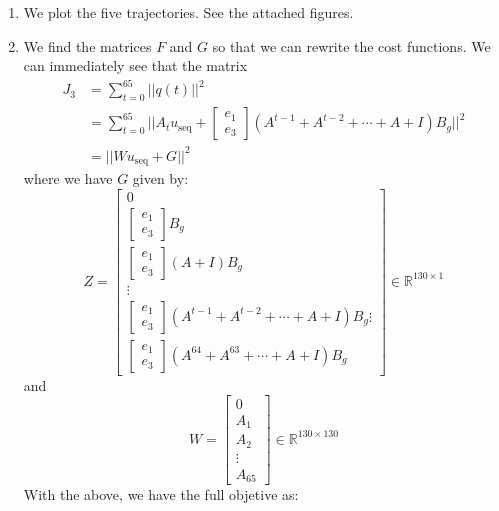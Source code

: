 \documentclass[12pt]{exam}
\begin{document}
\begin{questions}
\begin{solution}
\begin{enumerate}[label=(\alph*)]
      \item We plot the five trajectories. See the attached figures.
      \item We find the matrices $F$ and $G$ so that we can rewrite the cost functions. We can immediately see that the matrix 
      \begin{align*}
        J_3 &= \sum_{t=0}^{65} ||q(t)||^2 \\
        &= \sum_{t=0}^{65} || A_tu_{\text{seq}} + \begin{bmatrix} e_1 \\ e_3 \end{bmatrix} (A^{t-1} + A^{t-2} + \cdots + A + I)B_g||^2 \tag{Results from (a)} \\
        &= || Wu_{\text{seq}} +  G||^2
      \end{align*}
      where we have $G$ given by:
      \[
        Z = \begin{bmatrix}
          0 \\
          \begin{bmatrix} e_1 \\ e_3 \end{bmatrix} B_g \\
          \begin{bmatrix} e_1 \\ e_3 \end{bmatrix} (A + I)B_g \\
          \vdots \\
          \begin{bmatrix} e_1 \\ e_3 \end{bmatrix} (A^{t-1} + A^{t-2} + \cdots + A + I)B_g
          \vdots \\
          \begin{bmatrix} e_1 \\ e_3 \end{bmatrix} (A^{64} + A^{63} + \cdots + A + I)B_g
        \end{bmatrix} \in \mathbb{R}^{130 \times 1}
      \]
      and
      \[
        W = 
          \begin{bmatrix}
            0 \\
            A_1 \\
            A_2 \\
            \vdots \\
            A_{65}
          \end{bmatrix} \in \mathbb{R}^{130 \times 130}
      \]
      With the above, we have the full objetive as:

\end{enumerate}
\end{solution}
\end{questions}
\end{document}
